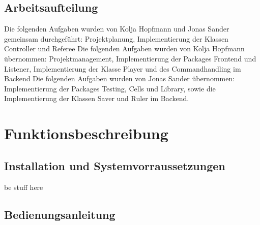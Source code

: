 \documentclass[12pt]{article}
\theoremstyle{plain}
\begin{document}
\begin{linenumbers}
\subsection{Arbeitsaufteilung}
Die folgenden Aufgaben wurden von Kolja Hopfmann und Jonas Sander gemeinsam durchgeführt:
\newline
Projektplanung, Implementierung der Klassen Controller und Referee
\newline
Die folgenden Aufgaben wurden von Kolja Hopfmann übernommen:
\newline
Projektmanagement, Implementierung der Packages Frontend und Listener, Implementierung der Klasse Player und des Commandhandling im Backend
\newline
Die folgenden Aufgaben wurden von Jonas Sander übernommen:
\newline
Implementierung der Packages Testing, Cells und Library, sowie die Implementierung der Klassen Saver und Ruler im Backend.
\section{Funktionsbeschreibung}
\subsection{Installation und Systemvorraussetzungen}
be stuff here
\subsection{Bedienungsanleitung}


\end{linenumbers}
\end{document}
